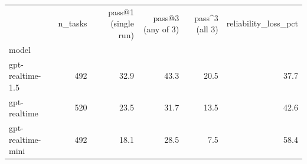 \begin{tabular}{lrrrrr}
\toprule
 & n_tasks & pass@1 (single run) & pass@3 (any of 3) & pass^3 (all 3) & reliability_loss_pct \\
model &  &  &  &  &  \\
\midrule
gpt-realtime-1.5 & 492 & 32.9 & 43.3 & 20.5 & 37.7 \\
gpt-realtime & 520 & 23.5 & 31.7 & 13.5 & 42.6 \\
gpt-realtime-mini & 492 & 18.1 & 28.5 & 7.5 & 58.4 \\
\bottomrule
\end{tabular}
